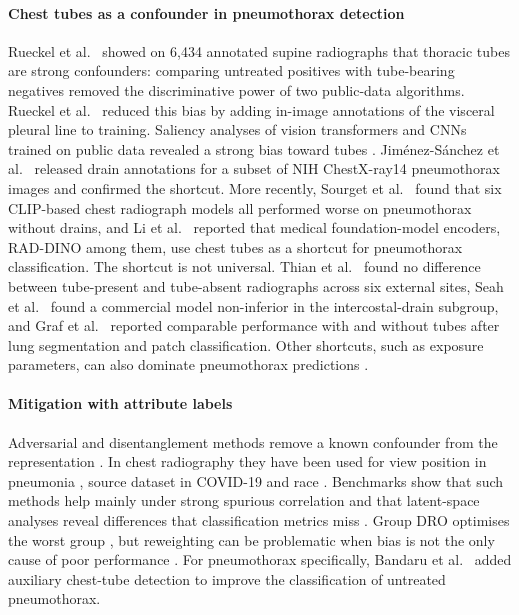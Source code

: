 \documentclass{ieeeaccess}
\begin{document}
\paragraph{Chest tubes as a confounder in pneumothorax detection}
Rueckel et al.~\cite{rueckel2020tubes} showed on 6{,}434 annotated supine radiographs that thoracic tubes are strong confounders: comparing untreated positives with tube-bearing negatives removed the discriminative power of two public-data algorithms. Rueckel et al.~\cite{rueckel2021annotations} reduced this bias by adding in-image annotations of the visceral pleural line to training. Saliency analyses of vision transformers and CNNs trained on public data revealed a strong bias toward tubes \cite{wollek2023attention}. Jim\'enez-S\'anchez et al.~\cite{jimenez2023shortcuts} released drain annotations for a subset of NIH ChestX-ray14 pneumothorax images and confirmed the shortcut. More recently, Sourget et al.~\cite{sourget2025clip} found that six CLIP-based chest radiograph models all performed worse on pneumothorax without drains, and Li et al.~\cite{li2025featurequality} reported that medical foundation-model encoders, RAD-DINO among them, use chest tubes as a shortcut for pneumothorax classification. The shortcut is not universal. Thian et al.~\cite{thian2021external} found no difference between tube-present and tube-absent radiographs across six external sites, Seah et al.~\cite{seah2021hidden} found a commercial model non-inferior in the intercostal-drain subgroup, and Graf et al.~\cite{graf2020tube} reported comparable performance with and without tubes after lung segmentation and patch classification. Other shortcuts, such as exposure parameters, can also dominate pneumothorax predictions \cite{shu2026exposure}.

\paragraph{Mitigation with attribute labels}
Adversarial and disentanglement methods remove a known confounder from the representation \cite{ganin2015dann,kim2019learning,zhao2020confounder}. In chest radiography they have been used for view position in pneumonia \cite{janizek2020adversarial}, source dataset in COVID-19 \cite{robinson2022disentangle} and race \cite{correa2023cav}. Benchmarks show that such methods help mainly under strong spurious correlation and that latent-space analyses reveal differences that classification metrics miss \cite{muller2026disentangle}. Group DRO optimises the worst group \cite{sagawa2020groupdro}, but reweighting can be problematic when bias is not the only cause of poor performance \cite{kumar2023droinvariant}. For pneumothorax specifically, Bandaru et al.~\cite{bandaru2026untreated} added auxiliary chest-tube detection to improve the classification of untreated pneumothorax.
\end{document}
